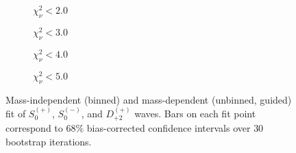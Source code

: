 \begin{figure}[htbp]
    \centering
    \begin{subfigure}{0.45\textwidth}
        
        \caption{$\chi^2_\nu < 2.0$}
    \end{subfigure}
    \hfill
    \begin{subfigure}{0.45\textwidth}
        
        \caption{$\chi^2_\nu < 3.0$}
    \end{subfigure}
    \vspace{1em}
    \begin{subfigure}{0.45\textwidth}
        
        \caption{$\chi^2_\nu < 4.0$}
    \end{subfigure}
    \hfill
    \begin{subfigure}{0.45\textwidth}
        
        \caption{$\chi^2_\nu < 5.0$}
    \end{subfigure}

    \caption{Mass-independent (binned) and mass-dependent (unbinned, guided) fit of $S_{0}^{(+)}$, $S_{0}^{(-)}$, and $D_{+2}^{(+)}$ waves. Bars on each fit point correspond to $68\%$ bias-corrected confidence intervals over $ 30 $ bootstrap iterations.}
    \label{fig:unbinned-guided-fit-all-Spn-D2p}
\end{figure}

